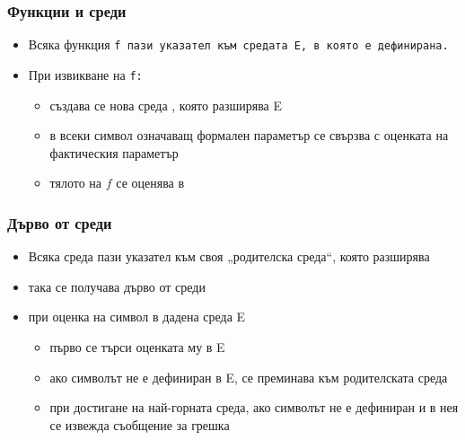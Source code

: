 \documentclass[alsotrans,beameroptions={aspectratio=169}]{beamerswitch}
\begin{document}
\begin{frame}
  \frametitle{Функции и среди}

  \begin{itemize}[<+->]
  \item Всяка функция \tt f пази указател към средата \env E, в която е дефинирана.
  \item При извикване на \tt f:
    \begin{itemize}
    \item създава се нова среда , която разширява \env E
    \item в  всеки символ означаващ формален параметър се свързва с оценката на фактическия параметър
    \item тялото на $f$ се оценява в 
    \end{itemize}
  \end{itemize}
\end{frame}

\begin{frame}
  \frametitle{Дърво от среди}
  \begin{itemize}[<+->]
  \item Всяка среда пази указател към своя „родителска среда“, която разширява
  \item така се получава дърво от среди
  \item при оценка на символ в дадена среда \env E
    \begin{itemize}
    \item първо се търси оценката му в \env E
    \item ако символът не е дефиниран в \env E, се преминава към родителската среда
    \item при достигане на най-горната среда, ако символът не е дефиниран и в нея се извежда съобщение за грешка
    \end{itemize}
  \end{itemize}
\end{frame}
\end{document}
